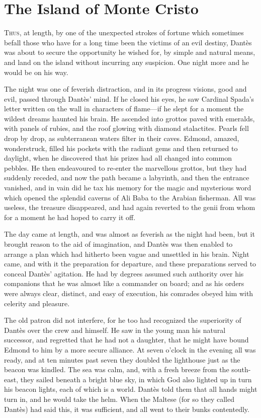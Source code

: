 \chapter{The Island of Monte Cristo} 

 \lettrine{T}{hus}, at length, by one of the unexpected strokes of fortune which sometimes befall those who have for a long time been the victims of an evil destiny, Dantès was about to secure the opportunity he wished for, by simple and natural means, and land on the island without incurring any suspicion. One night more and he would be on his way. 

 The night was one of feverish distraction, and in its progress visions, good and evil, passed through Dantès' mind. If he closed his eyes, he saw Cardinal Spada's letter written on the wall in characters of flame—if he slept for a moment the wildest dreams haunted his brain. He ascended into grottos paved with emeralds, with panels of rubies, and the roof glowing with diamond stalactites. Pearls fell drop by drop, as subterranean waters filter in their caves. Edmond, amazed, wonderstruck, filled his pockets with the radiant gems and then returned to daylight, when he discovered that his prizes had all changed into common pebbles. He then endeavoured to re-enter the marvellous grottos, but they had suddenly receded, and now the path became a labyrinth, and then the entrance vanished, and in vain did he tax his memory for the magic and mysterious word which opened the splendid caverns of Ali Baba to the Arabian fisherman. All was useless, the treasure disappeared, and had again reverted to the genii from whom for a moment he had hoped to carry it off. 

 The day came at length, and was almost as feverish as the night had been, but it brought reason to the aid of imagination, and Dantès was then enabled to arrange a plan which had hitherto been vague and unsettled in his brain. Night came, and with it the preparation for departure, and these preparations served to conceal Dantès' agitation. He had by degrees assumed such authority over his companions that he was almost like a commander on board; and as his orders were always clear, distinct, and easy of execution, his comrades obeyed him with celerity and pleasure. 

 The old patron did not interfere, for he too had recognized the superiority of Dantès over the crew and himself. He saw in the young man his natural successor, and regretted that he had not a daughter, that he might have bound Edmond to him by a more secure alliance. At seven o'clock in the evening all was ready, and at ten minutes past seven they doubled the lighthouse just as the beacon was kindled. The sea was calm, and, with a fresh breeze from the south-east, they sailed beneath a bright blue sky, in which God also lighted up in turn his beacon lights, each of which is a world. Dantès told them that all hands might turn in, and he would take the helm. When the Maltese (for so they called Dantès) had said this, it was sufficient, and all went to their bunks contentedly. 

